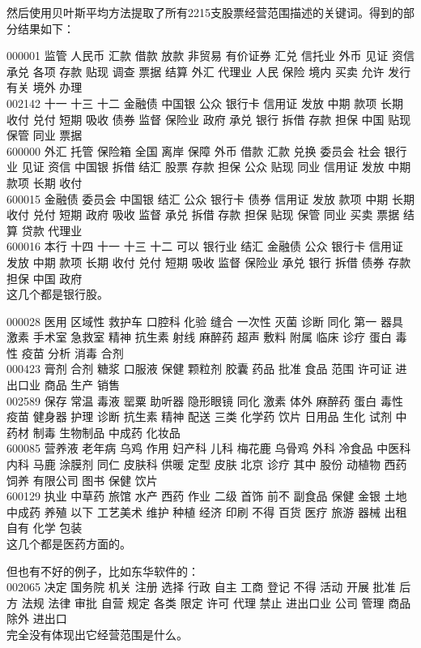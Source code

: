 \documentclass[12pt,a4paper]{article}
\begin{document}
\begin{CJK*}{UTF8}{song}
然后使用贝叶斯平均方法提取了所有2215支股票经营范围描述的关键词。得到的部分结果如下：

000001  监管 人民币 汇款 借款 放款 非贸易 有价证券 汇兑 信托业 外币 见证 资信 承兑 各项 存款 贴现 调查 票据 结算
外汇 代理业 人民 保险 境内 买卖 允许 发行 有关 境外 办理\\
002142  十一 十三 十二 金融债 中国银 公众 银行卡 信用证 发放 中期 款项 长期 收付 兑付 短期 吸收 债券 监督 保险业
政府 承兑 银行 拆借 存款 担保 中国 贴现 保管 同业 票据\\
600000  外汇 托管 保险箱 全国 离岸 保障 外币 借款 汇款 兑换 委员会 社会 银行业 见证 资信 中国银 拆借 结汇 股票 存款
担保 公众 贴现 同业 信用证 发放 中期 款项 长期 收付\\
600015  金融债 委员会 中国银 结汇 公众 银行卡 债券 信用证 发放 款项 中期 长期 收付 兑付 短期 政府 吸收 监督 承兑
拆借 存款 担保 贴现 保管 同业 买卖 票据 结算 贷款 代理业\\
600016  本行 十四 十一 十三 十二 可以 银行业 结汇 金融债 公众 银行卡 信用证 发放 中期 款项 长期 收付 兑付 短期 吸收
监督 保险业 承兑 银行 拆借 债券 存款 担保 中国 政府\\
这几个都是银行股。

000028  医用 区域性 救护车 口腔科 化验 缝合 一次性 灭菌 诊断 同化 第一 器具 激素 手术室 急救室 精神 抗生素 射线
麻醉药 超声 敷料 附属 临床 诊疗 蛋白 毒性 疫苗 分析 消毒 合剂\\
000423  膏剂 合剂 糖浆 口服液 保健 颗粒剂 胶囊 药品 批准 食品 范围 许可证 进出口业 商品 生产 销售\\
002589  保存 常温 毒液 罂粟 助听器 隐形眼镜 同化 激素 体外 麻醉药 蛋白 毒性 疫苗 健身器 护理 诊断 抗生素 精神 配送
三类 化学药 饮片 日用品 生化 试剂 中药材 制毒 生物制品 中成药 化妆品\\
600085  营养液 老年病 乌鸡 作用 妇产科 儿科 梅花鹿 乌骨鸡 外科 冷食品 中医科 内科 马鹿 涂膜剂 同仁 皮肤科 供暖 定型
皮肤 北京 诊疗 其中 股份 动植物 西药 饲养 有限公司 图书 保健 饮片\\
600129  执业 中草药 旅馆 水产 西药 作业 二级 首饰 前不 副食品 保健 金银 土地 中成药 养殖 以下 工艺美术 维护 种植
经济 印刷 不得 百货 医疗 旅游 器械 出租 自有 化学 包装\\
这几个都是医药方面的。

但也有不好的例子，比如东华软件的：\\
002065  决定 国务院 机关 注册 选择 行政 自主 工商 登记 不得 活动 开展 批准 后方 法规 法律 审批 自营 规定 各类 限定
许可 代理 禁止 进出口业 公司 管理 商品 除外 进出口\\
完全没有体现出它经营范围是什么。



%
%

\end{CJK*}
\end{document}
